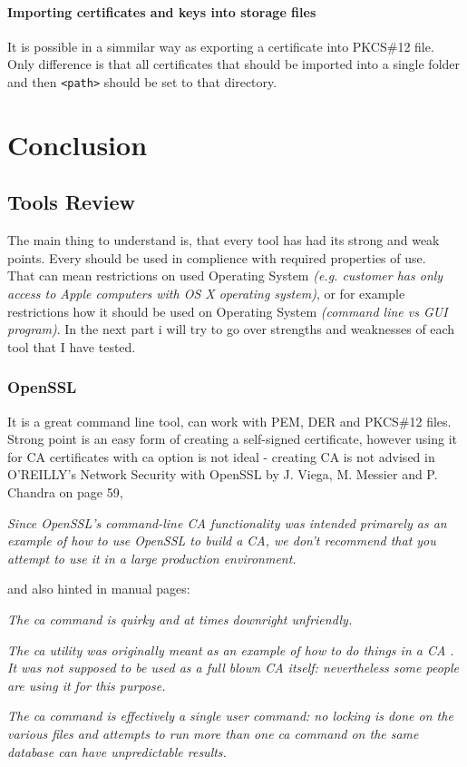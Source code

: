 \documentclass[10pt, a4paper]{report}
\begin{document}
  \subsection{Importing certificates and keys into storage files}
It is possible in a simmilar way as exporting a certificate into PKCS\#12 file. Only difference is that all certificates that should be imported into a single folder and then \verb+<path>+ should be set to that directory. 
  
\part{Conclusion}

\chapter{Tools Review}

The main thing to understand is, that every tool has had its strong and weak points. Every should be used in complience with required properties of use.\\ 

That can mean restrictions on used Operating System \textit{(e.g. customer has only access to Apple computers with OS X operating system)}, or for example restrictions how it should be used on Operating System \textit{(command line vs GUI program)}. In the next part i will try to go over strengths and weaknesses of each tool that I have tested.

\section{OpenSSL}
It is a great command line tool, can work with PEM, DER and PKCS\#12 files. Strong point is an easy form of creating a self-signed certificate, however using it for CA certificates with ca option is not ideal -  creating CA is not advised in O'REILLY's Network Security with OpenSSL by J. Viega, M. Messier and P. Chandra on page 59,
\begin{displayquote}
\textit{Since OpenSSL's command-line CA functionality was intended primarely as an example of how to use OpenSSL to build a CA, we don't recommend that you attempt to use it in a large production environment.}
\end{displayquote}
and also hinted in manual pages:
\begin{displayquote}
\textit{The ca command is quirky and at times downright unfriendly.}

\textit{The ca utility was originally meant as an example of how to do things in a CA . It was not supposed to be used as a full blown CA itself: nevertheless some people are using it for this purpose.}

\textit{The ca command is effectively a single user command: no locking is done on the various files and attempts to run more than one ca command on the same database can have unpredictable results.}

\end{displayquote}
\end{document}
